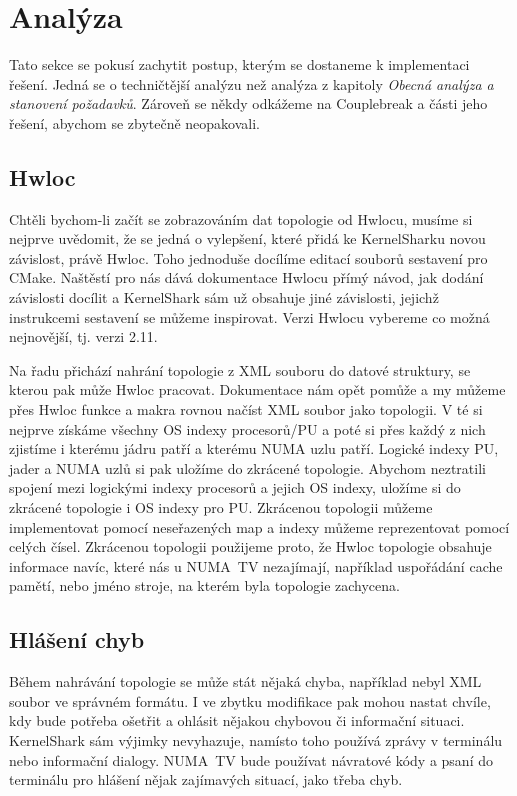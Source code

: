 \section{Analýza}
Tato sekce se pokusí zachytit postup, kterým se dostaneme k implementaci řešení. Jedná se o techničtější analýzu než analýza z kapitoly \emph{Obecná analýza a stanovení požadavků}. Zároveň se někdy odkážeme na Couplebreak a části jeho řešení, abychom se zbytečně neopakovali.

\subsection{Hwloc}
Chtěli bychom-li začít se zobrazováním dat topologie od Hwlocu, musíme si nejprve uvědomit, že se jedná o vylepšení, které přidá ke KernelSharku novou závislost, právě Hwloc. Toho jednoduše docílíme editací souborů sestavení pro CMake. Naštěstí pro nás dává dokumentace Hwlocu \cite{Hwloc-Docs} přímý návod, jak dodání závislosti docílit a KernelShark sám už obsahuje jiné závislosti, jejichž instrukcemi sestavení se můžeme inspirovat. Verzi Hwlocu vybereme co možná nejnovější, tj. verzi 2.11.

Na řadu přichází nahrání topologie z XML souboru do datové struktury, se kterou pak může Hwloc pracovat. Dokumentace nám opět pomůže a my můžeme přes Hwloc funkce a makra rovnou načíst XML soubor jako topologii. V té si nejprve získáme všechny OS indexy procesorů/PU a poté si přes každý z nich zjistíme i kterému jádru patří a kterému NUMA uzlu patří. Logické indexy PU, jader a NUMA uzlů si pak uložíme do zkrácené topologie. Abychom neztratili spojení mezi logickými indexy procesorů a jejich OS indexy, uložíme si do zkrácené topologie i OS indexy pro PU. Zkrácenou topologii můžeme implementovat pomocí neseřazených map a indexy můžeme reprezentovat pomocí celých čísel. Zkrácenou topologii použijeme proto, že Hwloc topologie obsahuje informace navíc, které nás u NUMA~TV nezajímají, například uspořádání cache pamětí, nebo jméno stroje, na kterém byla topologie zachycena.

\subsection{Hlášení chyb}

Během nahrávání topologie se může stát nějaká chyba, například nebyl XML soubor ve správném formátu. I ve zbytku modifikace pak mohou nastat chvíle, kdy bude potřeba ošetřit a ohlásit nějakou chybovou či informační situaci. KernelShark sám výjimky nevyhazuje, namísto toho používá zprávy v terminálu nebo informační dialogy. NUMA~TV bude používat návratové kódy a psaní do terminálu pro hlášení nějak zajímavých situací, jako třeba chyb.

